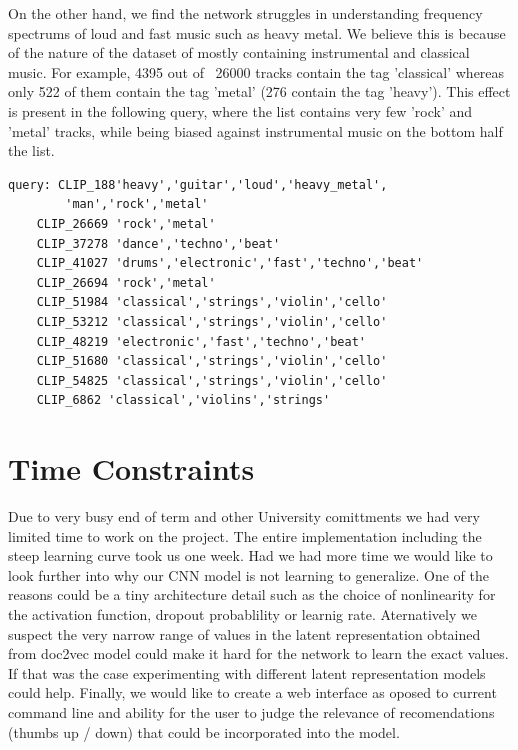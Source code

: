 \documentclass[11pt, a4paper]{article}
\begin{document}
    \noindent
    On the other hand, we find the network struggles in understanding frequency
    spectrums of loud and fast music such as heavy metal. We believe this is
    because of the nature of the dataset of mostly containing instrumental and
    classical music. For example, 4395 out of ~26000 tracks contain the tag
    'classical' whereas only 522 of them contain the tag 'metal' (276 contain the
    tag 'heavy'). This effect is present in the following query, where the list
    contains very few 'rock' and 'metal' tracks, while being biased against
    instrumental music on the bottom half the list.

    \begin{Verbatim}[xleftmargin=.5in]
    query: CLIP_188'heavy','guitar','loud','heavy_metal',
        'man','rock','metal'
    CLIP_26669 'rock','metal'
    CLIP_37278 'dance','techno','beat'
    CLIP_41027 'drums','electronic','fast','techno','beat'
    CLIP_26694 'rock','metal'
    CLIP_51984 'classical','strings','violin','cello'
    CLIP_53212 'classical','strings','violin','cello'
    CLIP_48219 'electronic','fast','techno','beat'
    CLIP_51680 'classical','strings','violin','cello'
    CLIP_54825 'classical','strings','violin','cello'
    CLIP_6862 'classical','violins','strings'
    \end{Verbatim}

  \section{Time Constraints}
    Due to very busy end of term and other University comittments we had very
    limited time to work on the project. The entire implementation including
    the steep learning curve took us one week. Had we had more time we would
    like to look further into why our CNN model is not learning to generalize.
    One of the reasons could be a tiny architecture detail such as the choice
    of nonlinearity for the activation function, dropout probablility or
    learnig rate. Aternatively we suspect the very narrow range of values in
    the latent representation obtained from doc2vec model could make it hard
    for the network to learn the exact values. If that was the case
    experimenting with different latent representation models could help.
    Finally, we would like to create a web interface as oposed to current
    command line and ability for the user to judge the relevance of
    recomendations (thumbs up / down) that could be incorporated into the
    model.
    
\end{document}
